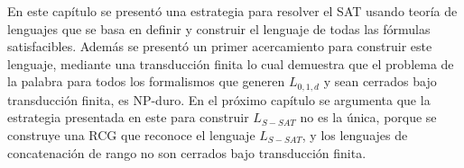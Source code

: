 En este capítulo se presentó una estrategia para resolver el SAT usando teoría de lenguajes que se basa en 
definir y construir el lenguaje de todas las fórmulas satisfacibles. Además se presentó un primer acercamiento 
para construir este lenguaje, mediante una transducción finita lo cual demuestra que el problema de la palabra 
para todos los formalismos que generen $L_{0,1,d}$ y sean cerrados bajo transducción finita, es NP-duro.
En el próximo capítulo se argumenta que la estrategia presentada en este para construir $L_{S-SAT}$ no es la única,
porque se construye una RCG que reconoce el lenguaje $L_{S-SAT}$, y los lenguajes de concatenación de rango 
no son cerrados bajo transducción finita. 

